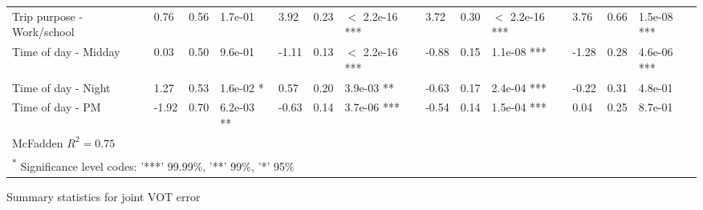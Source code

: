\documentclass{article}\usepackage[utf8]{inputenc}
\begin{document}
\begin{table}[H]
\begin{tabular}{lllllllllllll}
Trip purpose - Work/school & 0.76 & 0.56 & 1.7e-01 & 3.92 & 0.23 & $<$ 2.2e-16 *** & 3.72 & 0.30 & $<$ 2.2e-16 *** & 3.76 & 0.66 & 1.5e-08 ***\\
Time of day - Midday & 0.03 & 0.50 & 9.6e-01 & -1.11 & 0.13 & $<$ 2.2e-16 *** & -0.88 & 0.15 & 1.1e-08 *** & -1.28 & 0.28 & 4.6e-06 ***\\
Time of day - Night & 1.27 & 0.53 & 1.6e-02 * & 0.57 & 0.20 & 3.9e-03 ** & -0.63 & 0.17 & 2.4e-04 *** & -0.22 & 0.31 & 4.8e-01\\
Time of day - PM & -1.92 & 0.70 & 6.2e-03 ** & -0.63 & 0.14 & 3.7e-06 *** & -0.54 & 0.14 & 1.5e-04 *** & 0.04 & 0.25 & 8.7e-01\\
\bottomrule
\multicolumn{13}{l}{McFadden $R^2=0.75$}\\
\multicolumn{13}{l}{\textsuperscript{*} Significance level codes: '***' 99.99\%, '**' 99\%, '*' 95\%}\\
\end{tabular}
\endgroup{} \end{table} \begin{table}[H]\centering\setlength{\tabcolsep}{4pt}\caption{Summary statistics for joint VOT error} \begingroup\fontsize{8}{10}\selectfont


\end{table}
\end{document}
